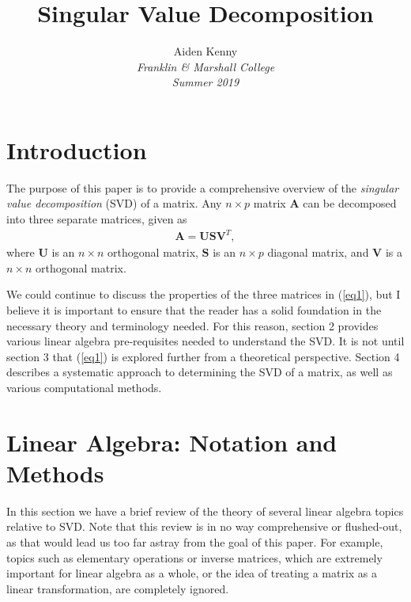 \documentclass[10pt]{article}
\newcommand{\mydef}[1]{\textcolor{SteelBlue3}{\textit{#1}}} %
\begin{document}

\title{\Large \textbf{Singular Value Decomposition}}
\author{{\large  Aiden Kenny}\\
{\large \it Franklin \&{} Marshall College}\\
{\large \it Summer 2019}}
\date{}
\maketitle


\section{Introduction}

The purpose of this paper is to provide a comprehensive overview of the \mydef{singular value decomposition} (SVD) of a matrix. Any $n \times p$ matrix $\mathbf{A}$ can be decomposed into three separate matrices, given as 
\begin{align}
    \mathbf{A} = \mathbf{U} \mathbf{S} \mathbf{V}^T, \label{eq1}
\end{align}
where $\mathbf{U}$ is an $n \times n$ orthogonal matrix, $\mathbf{S}$ is an $n \times p$ diagonal matrix, and $\mathbf{V}$ is a $n \times n$ orthogonal matrix. 

We could continue to discuss the properties of the three matrices in (\ref{eq1}), but I believe it is important to ensure that the reader has a solid foundation in the necessary theory and terminology needed. For this reason, section 2 provides various linear algebra pre-requisites needed to understand the SVD. It is not until section 3 that (\ref{eq1}) is explored further from a theoretical perspective. Section 4 describes a systematic approach to determining the SVD of a matrix, as well as various computational methods. 

\section{Linear Algebra: Notation and Methods}

In this section we have a brief review of the theory of several linear algebra topics relative to SVD. Note that this review is in no way comprehensive or flushed-out, as that would lead us too far astray from the goal of this paper. For example, topics such as elementary operations or inverse matrices, which are extremely important for linear algebra as a whole, or the idea of treating a matrix as a linear transformation, are completely ignored. 
\end{document}
